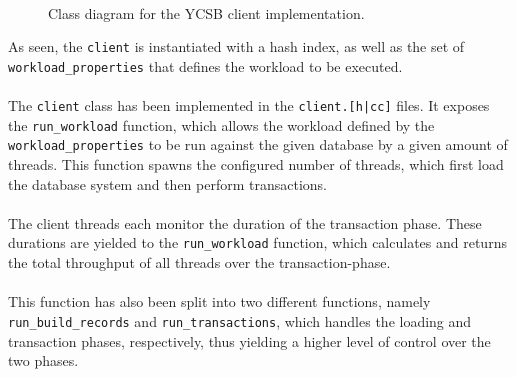 \documentclass[11pt]{report} %
\begin{document}
\begin{figure}[H]
  \\
  \caption{Class diagram for the YCSB client implementation.}\label{fig:UML_client}
\end{figure}
\noindent
As seen, the \verb|client| is instantiated with a hash index, as well as the set of \verb|workload_properties| that defines the workload to be executed. \\
\\
The \verb|client| class has been implemented in the \verb=client.[h|cc]= files. It exposes the \verb|run_workload| function, which allows the workload defined by the \verb|workload_properties| to be run against the given database by a given amount of threads. This function spawns the configured number of threads, which first load the database system and then perform transactions. \\
\\
The client threads each monitor the duration of the transaction phase. These durations are yielded to the \verb|run_workload| function, which calculates and returns the total throughput of all threads over the transaction-phase. \\
\\
This function has also been split into two different functions, namely \verb|run_build_records| and \verb|run_transactions|, which handles the loading and transaction phases, respectively, thus yielding a higher level of control over the two phases. 
\end{document}
